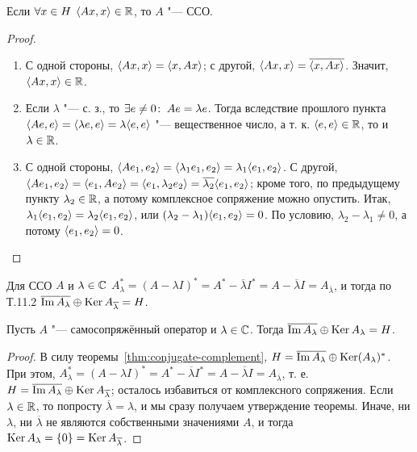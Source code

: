 \documentclass[main]{subfiles}
\begin{document}
\begin{exercise}
  Если \( \forall {x \in H} \; \, \langle Ax, x \rangle \in \mathbb{R} \),
  то \( A \) "--- ССО.
\end{exercise}

\begin{proof}~\begin{enumerate}
  \item С одной стороны, \( \langle Ax, x \rangle = \langle x, Ax \rangle \);
    с другой, \( \langle Ax, x \rangle = \overline{\langle x, Ax \rangle} \).
    Значит, \( \langle Ax, x \rangle \in \mathbb{R} \).
  \item Если \( \lambda \) "--- с. з., то
    \( \exists e \ne 0 \colon \: Ae = \lambda e \).
    Тогда вследствие прошлого пункта
    \( \langle Ae, e \rangle = \langle \lambda e, e \rangle =
    \lambda \langle e, e \rangle \) "---
    вещественное число, а т. к. \( \langle e, e \rangle \in \mathbb{R} \),
    то и \( \lambda \in \mathbb{R} \).
  \item С одной стороны,
    \( \langle A e_1, e_2 \rangle = \langle \lambda_1 e_1, e_2 \rangle =
    \lambda_1 \langle e_1, e_2 \rangle \).
    С другой,
    \( \langle A e_1, e_2 \rangle = \langle e_1, A e_2 \rangle =
    \langle e_1, \lambda_2 e_2 \rangle =
    \overline{\lambda_2} \langle e_1, e_2 \rangle \);
    кроме того, по предыдущему пункту \( \lambda_2 \in \mathbb{R} \),
    а потому комплексное сопряжение можно опустить.
    Итак, \( \lambda_1 \langle e_1, e_2 \rangle =
    \lambda_2 \langle e_1, e_2 \rangle \),
    или \( (\lambda_2 - \lambda_1) \langle e_1, e_2 \rangle = 0 \).
    По условию, \( \lambda_2 - \lambda_1 \ne 0 \),
    а потому \( \langle e_1, e_2 \rangle = 0 \).
\end{enumerate}\end{proof}

Для ССО \( A \) и \( \lambda \in \mathbb{C} \)
\( A_\lambda^* = (A - \lambda I)^* = A^* - \overline{\lambda} I^* =
A - \overline{\lambda} I = A_{\overline{\lambda}} \),
и тогда по Т.11.2
\( \overline{\operatorname{Im} A_\lambda} \oplus
\operatorname{Ker} A_{\overline{\lambda}} = H \).

\begin{theorem}%
  Пусть \( A \) "--- самосопряжённый оператор и
  \( \lambda \in \mathbb{C} \).
  Тогда
  \( \overline{\operatorname{Im} A_\lambda} \oplus
  \operatorname{Ker} A_{\lambda} = H \).
\end{theorem}
\begin{proof}
  В силу теоремы~\ref{thm:conjugate-complement},
  \( H = \overline{\operatorname{Im} A_\lambda} \oplus \operatorname{Ker} (A_\lambda)^* \).
  При этом,
  \( A_\lambda^* = (A - \lambda I)^* =
  A^* - \overline{\lambda} I^* =
  A - \overline{\lambda} I =
  A_{\overline{\lambda}} \),
  т. е. \( H = \overline{\operatorname{Im} A_\lambda} \oplus \operatorname{Ker} A_{\overline{\lambda}} \);
  осталось избавиться от комплексного сопряжения.
  Если \( \lambda \in \mathbb{R} \), то попросту
  \( \overline{\lambda} = \lambda \),
  и мы сразу получаем утверждение теоремы.
  Иначе, ни \( \lambda \),
  ни \( \overline{\lambda} \) не являются собственными
  значениями \( A \), и тогда
  \( \operatorname{Ker} A_\lambda = \{ 0 \} = \operatorname{Ker} A_{\overline\lambda} \).
\end{proof}
\end{document}
